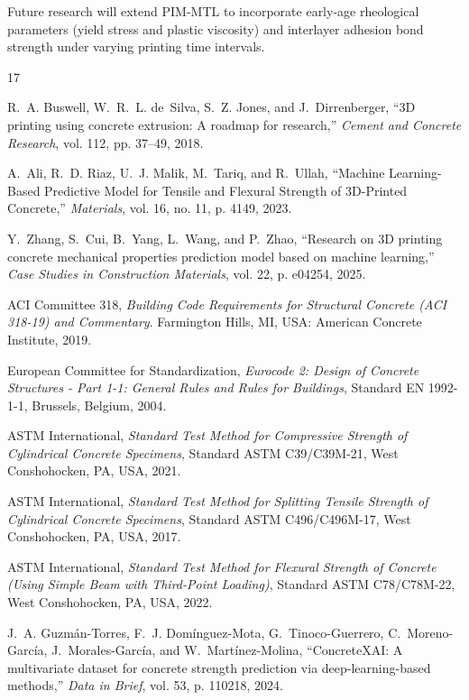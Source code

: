 \documentclass[conference]{IEEEtran}
\begin{document}
Future research will extend PIM-MTL to incorporate early-age rheological parameters (yield stress and plastic viscosity) and interlayer adhesion bond strength under varying printing time intervals.

\begin{thebibliography}{17}

R.~A. Buswell, W.~R.~L. de~Silva, S.~Z. Jones, and J.~Dirrenberger, ``3D printing using concrete extrusion: A roadmap for research,'' \textit{Cement and Concrete Research}, vol. 112, pp. 37--49, 2018.

A.~Ali, R.~D. Riaz, U.~J. Malik, M.~Tariq, and R.~Ullah, ``Machine Learning-Based Predictive Model for Tensile and Flexural Strength of 3D-Printed Concrete,'' \textit{Materials}, vol. 16, no. 11, p. 4149, 2023.

Y.~Zhang, S.~Cui, B.~Yang, L.~Wang, and P.~Zhao, ``Research on 3D printing concrete mechanical properties prediction model based on machine learning,'' \textit{Case Studies in Construction Materials}, vol. 22, p. e04254, 2025.

{ACI Committee 318}, \textit{Building Code Requirements for Structural Concrete (ACI 318-19) and Commentary}. Farmington Hills, MI, USA: American Concrete Institute, 2019.

{European Committee for Standardization}, \textit{Eurocode 2: Design of Concrete Structures - Part 1-1: General Rules and Rules for Buildings}, Standard EN 1992-1-1, Brussels, Belgium, 2004.

{ASTM International}, \textit{Standard Test Method for Compressive Strength of Cylindrical Concrete Specimens}, Standard ASTM C39/C39M-21, West Conshohocken, PA, USA, 2021.

{ASTM International}, \textit{Standard Test Method for Splitting Tensile Strength of Cylindrical Concrete Specimens}, Standard ASTM C496/C496M-17, West Conshohocken, PA, USA, 2017.

{ASTM International}, \textit{Standard Test Method for Flexural Strength of Concrete (Using Simple Beam with Third-Point Loading)}, Standard ASTM C78/C78M-22, West Conshohocken, PA, USA, 2022.

J.~A. Guzm{\'a}n-Torres, F.~J. Dom{\'i}nguez-Mota, G.~Tinoco-Guerrero, C.~Moreno-Garc{\'i}a, J.~Morales-Garc{\'i}a, and W.~Mart{\'i}nez-Molina, ``ConcreteXAI: A multivariate dataset for concrete strength prediction via deep-learning-based methods,'' \textit{Data in Brief}, vol. 53, p. 110218, 2024.


\end{thebibliography}
\end{document}
